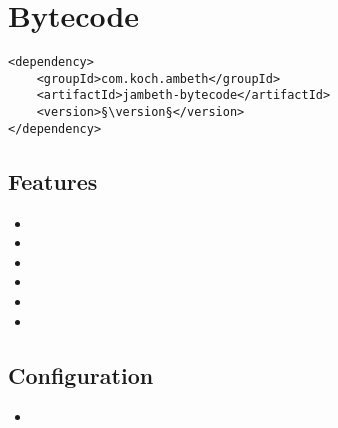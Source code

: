 \section{Bytecode}
\label{module:Bytecode}
\ClearAPI
\TODO
\begin{lstlisting}[style=POM,caption={Maven modules to use \emph{Ambeth Bytecode}}]
<dependency>
	<groupId>com.koch.ambeth</groupId>
	<artifactId>jambeth-bytecode</artifactId>
	<version>§\version§</version>
</dependency>
\end{lstlisting}
\subsection{Features}
\begin{itemize}
	\item {}
	\item {}
	\item {}
	\item {}
	\item {}
	\item {}
\end{itemize}

\subsection{Configuration}
\begin{itemize}
	\item {}
\end{itemize}

